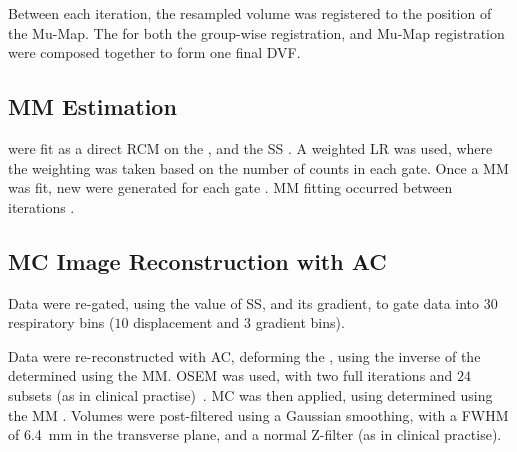         Between each iteration, the resampled volume was registered to the position of the \gls{Mu-Map}. The  for both the group-wise registration, and \gls{Mu-Map} registration were composed together to form one final \gls{DVF}.%
    
    \vspace{-0.5cm}
    
    \subsection{\acrlong{MM} Estimation} \label{sec:motion_model_estimation}
         were fit as a direct \acrlong{RCM} on the , %
        and the \gls{SS}%
        . A weighted \acrlong{LR} was used, where the weighting was taken based on the number of counts in each gate. Once a \gls{MM} was fit, new  were generated for each gate%
        . \gls{MM} fitting occurred between iterations%
        .
    
    \vspace{-0.5cm}
    
    \subsection{\gls{MC} Image Reconstruction with \gls{AC}} \label{sec:mc_image_reconstruction_with_ac}
        Data were re-gated, using the value of \gls{SS}, and its gradient, to gate data into $30$ respiratory bins ($10$ displacement and $3$ gradient bins).
        
        Data were re-reconstructed with \gls{AC}, deforming the , using the inverse of the  determined using the \gls{MM}. %
        \acrshort{OSEM} was used, with two full iterations and $24$ subsets (as in clinical practise)~\cite{Hudson1994}. \gls{MC} was then applied, using  determined using the \gls{MM}%
        . Volumes were post-filtered using a Gaussian smoothing, with a \acrshort{FWHM} of \SI{6.4}{\milli\metre} in the transverse plane, and a normal Z-filter (as in clinical practise).
    
